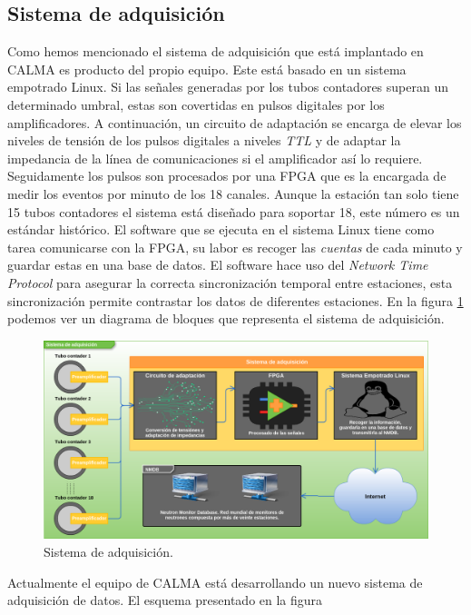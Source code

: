 	\subsection{Sistema de adquisición}
		Como hemos mencionado el sistema de adquisición que está implantado en CALMA es producto del propio equipo\cite{Garcia2014}. Este está
		basado en un sistema empotrado Linux. Si las señales generadas por los tubos contadores superan un determinado umbral, estas son
		covertidas en pulsos digitales por los amplificadores. A continuación, un circuito de adaptación se encarga de elevar los niveles de
		tensión de los pulsos digitales a niveles \emph{TTL} y de adaptar la impedancia de la línea de comunicaciones si el amplificador
		así lo requiere. Seguidamente los pulsos son procesados por una FPGA que es la encargada de medir los eventos por minuto de los 18
		canales. Aunque la estación tan solo tiene 15 tubos contadores el sistema está diseñado para soportar 18, este número es un estándar
		histórico. El software que se ejecuta en el sistema Linux tiene como tarea comunicarse con la FPGA, su labor es recoger las
		\emph{cuentas} de cada minuto y guardar estas en una base de datos. El software hace uso del \emph{Network Time Protocol} para
		asegurar la correcta sincronización temporal entre estaciones, esta sincronización permite contrastar los datos de diferentes
		estaciones. En la figura \ref{fig:acqsis} podemos ver un diagrama de bloques que representa el sistema de adquisición.
		\begin{figure}[h]
			\centering
			\includegraphics[keepaspectratio, width=1\textwidth]{./img/AcqSis.png}
			\caption{Sistema de adquisición.}
			\label{fig:acqsis}
		\end{figure}
		\par
		Actualmente el equipo de CALMA está desarrollando un nuevo sistema de adquisición de datos. El esquema presentado en la figura
